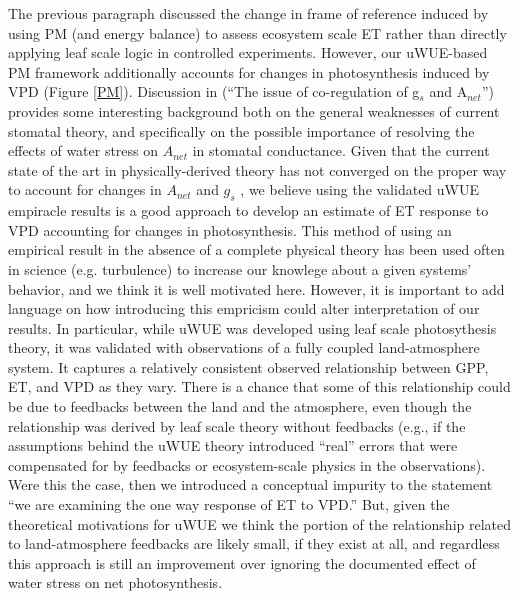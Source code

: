 \documentclass[12pt]{article}
\begin{document}
The previous paragraph discussed the change in frame of reference
induced by using PM (and energy balance) to assess ecosystem scale ET
rather than directly applying leaf scale logic in controlled
experiments. However, our uWUE-based PM framework additionally
accounts for changes in photosynthesis induced by VPD (Figure
\ref{PM}). Discussion in \cite{Damour2010} (``The issue of
co-regulation of g$_s$ and A$_{net}$'') provides some interesting
background both on the general weaknesses of current stomatal theory,
and specifically on the possible importance of resolving the effects
of water stress on $A_{net}$ in stomatal conductance. Given that the
current state of the art in physically-derived theory has not
converged on the proper way to account for changes in $A_{net}$ and
$g_s$ \citep{Damour2010}, we believe using the validated uWUE
empiracle results \citep[e.g. Figure 3,][]{Zhou_2014} is a good
approach to develop an estimate of ET response to VPD accounting for
changes in photosynthesis. This method of using an empirical result in
the absence of a complete physical theory has been used often in
science (e.g. turbulence) to increase our knowlege about a given
systems' behavior, and we think it is well motivated here. However, it
is important to add language on how introducing this
empricism could alter interpretation of our results. In particular,
while uWUE was developed using leaf scale photosythesis theory, it was
validated with observations of a fully coupled land-atmosphere
system. It captures a relatively consistent observed relationship
between GPP, ET, and VPD as they vary. There is a chance that some of
this relationship could be due to feedbacks between the land and the
atmosphere, even though the relationship was derived by leaf scale
theory without feedbacks (e.g., if the assumptions behind the uWUE
theory introduced ``real'' errors that were compensated for by
feedbacks or ecosystem-scale physics in the observations).  Were this
the case, then we introduced a conceptual impurity to the statement
``we are examining the one way response of ET to VPD.''  But, given
the theoretical motivations for uWUE we think the portion of the
relationship related to land-atmosphere feedbacks are likely small, if
they exist at all, and regardless this approach is still an
improvement over ignoring the documented effect of water stress on net
photosynthesis.
\end{document}
